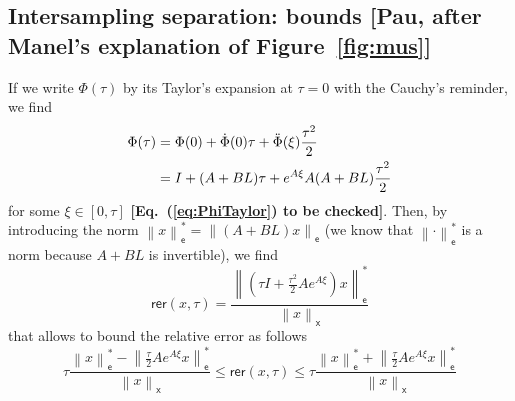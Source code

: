 \documentclass[12pt,draftcls,onecolumn]{IEEEtran} %
\newcommand{\nE}[1]{\left\|#1\right\|_{\mathsf e}}
\newcommand{\nX}[1]{\left\|#1\right\|_{\mathsf x}}
\newcommand{\NN}{\mathbb{N}}
\begin{document}


\subsection{Intersampling separation: bounds [Pau, after Manel's
  explanation of Figure~\ref{fig:mus}]}
\label{sec:tauKbounds}

If we write $\Phi(\tau)$ by its Taylor's expansion at $\tau=0$ with
the Cauchy's reminder, we find
\begin{align}
  \label{eq:PhiTaylor}
  \Phi(\tau) & = \Phi(0)+\dot{\Phi}(0)\tau+\ddot\Phi(\xi)\frac{\tau^2}2 \notag\\
  & = I+(A+BL)\tau+e^{A\xi}A(A+BL)\frac{\tau^2}2
\end{align}
for some $\xi\in[0,\tau]$ \textbf{[Eq.~(\ref{eq:PhiTaylor}) to be
  checked]}. Then, by introducing the norm $\nE{x}^*=\nE{(A+BL)x}$ (we
know that $\nE{\cdot}^*$ is a norm because $A+BL$ is invertible), we
find
\begin{equation}
  \label{eq:rerTaylor}
  \mathsf{rer}(x,\tau) = \frac{\nE{(\tau I+\frac{\tau^2}{2}Ae^{A\xi})x}^*}{\nX{x}}
\end{equation}
that allows to bound the relative error as follows
\begin{equation}
  \label{eq:rerBounds}
  \tau\frac{\nE{x}^*-\nE{\frac{\tau}{2}Ae^{A\xi}x}^*}{\nX{x}}
  \leq\mathsf{rer}(x,\tau)\leq
  \tau\frac{\nE{x}^*+\nE{\frac{\tau}{2}Ae^{A\xi}x}^*}{\nX{x}}
\end{equation}
\end{document}
